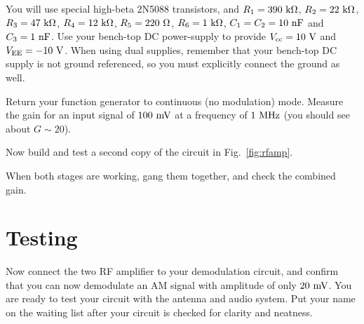 \documentclass[12pt]{article}
\begin{document}
You will use special high-beta 2N5088 transistors, and $R_1=390~\rm k\Omega$, $R_2=22~\rm k\Omega$, $R_3=47~\rm k\Omega$, $R_4=12~\rm k\Omega$, $R_5=220~\rm \Omega$, $R_6=1~\rm k\Omega$, $C_1=C_2=10~\rm nF$ and $C_3=1~\rm nF$.   Use your bench-top DC power-supply to provide $V_{\rm cc} = 10~\rm V$ and $V_{\rm EE}= -10~\rm V$.   When using dual supplies, remember that your bench-top DC supply is not ground referenced, so you must explicitly connect the ground as well.


Return your function generator to continuous (no modulation) mode.  Measure the gain for an input signal of $100~\rm mV$ at a frequency of $1~\rm MHz$ (you should see about $G \sim 20$).

Now build and test a second copy of the circuit in Fig.~\ref{fig:rfamp}.

When both stages are working, gang them together, and check the combined gain.

\section{Testing}

Now connect the two RF amplifier to your demodulation circuit, and confirm that you can now demodulate an AM signal with amplitude of only $20~\rm mV$.  You are ready to test your circuit with the antenna and audio system.  Put your name on the waiting list after your circuit is checked for clarity and neatness. 
\end{document}
